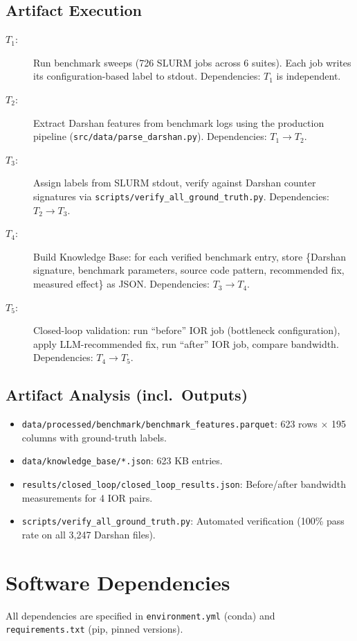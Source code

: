 \documentclass[conference]{IEEEtran}
\newcommand{\artcomp}{\subsection*{Artifact Execution}}
\newcommand{\artout}{\subsection*{Artifact Analysis (incl.\ Outputs)}}
\begin{document}
\artcomp
\begin{description}
\item[$T_1$:] Run benchmark sweeps (726 SLURM jobs across 6 suites).
Each job writes its configuration-based label to stdout.
Dependencies: $T_1$ is independent.
\item[$T_2$:] Extract Darshan features from benchmark logs using
the production pipeline (\texttt{src/data/parse\_darshan.py}).
Dependencies: $T_1 \rightarrow T_2$.
\item[$T_3$:] Assign labels from SLURM stdout, verify against
Darshan counter signatures via
\texttt{scripts/verify\_all\_ground\_truth.py}.
Dependencies: $T_2 \rightarrow T_3$.
\item[$T_4$:] Build Knowledge Base: for each verified benchmark
entry, store \{Darshan signature, benchmark parameters, source
code pattern, recommended fix, measured effect\} as JSON.
Dependencies: $T_3 \rightarrow T_4$.
\item[$T_5$:] Closed-loop validation: run ``before'' IOR job
(bottleneck configuration), apply LLM-recommended fix, run
``after'' IOR job, compare bandwidth.
Dependencies: $T_4 \rightarrow T_5$.
\end{description}

\artout
\begin{itemize}
\item \texttt{data/processed/benchmark/benchmark\_features.parquet}:
623 rows $\times$ 195 columns with ground-truth labels.
\item \texttt{data/knowledge\_base/*.json}: 623 KB entries.
\item \texttt{results/closed\_loop/closed\_loop\_results.json}:
Before/after bandwidth measurements for 4 IOR pairs.
\item \texttt{scripts/verify\_all\_ground\_truth.py}: Automated
verification (100\% pass rate on all 3{,}247 Darshan files).
\end{itemize}

\section{Software Dependencies}

All dependencies are specified in \texttt{environment.yml} (conda)
and \texttt{requirements.txt} (pip, pinned versions).
\end{document}
